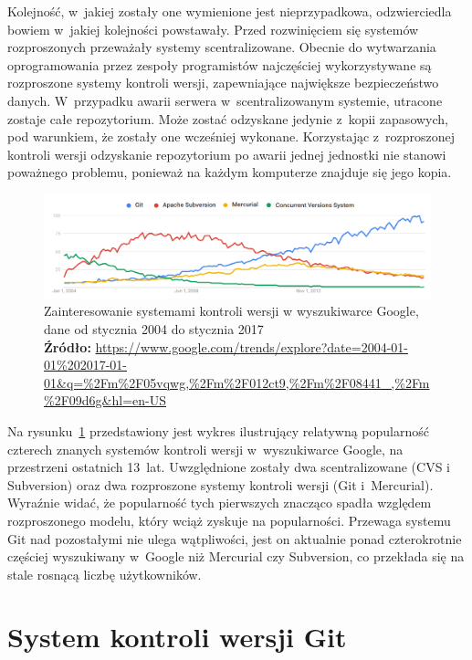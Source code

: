 \documentclass[11pt,a4paper,polish,thesis]{dcsbook}
\newcommand*{\captionsource}[2]{%
	\caption[{#1}]{%
		#1%
		\\\hspace{\linewidth}%
		\textbf{Źródło: } #2%
	}%
}
\begin{document}
	Kolejność, w~jakiej zostały one wymienione jest nieprzypadkowa, odzwierciedla bowiem w~jakiej kolejności powstawały. Przed rozwinięciem się systemów rozproszonych przeważały systemy scentralizowane. Obecnie do wytwarzania oprogramowania przez zespoły programistów najczęściej wykorzystywane są rozproszone systemy kontroli wersji, zapewniające największe bezpieczeństwo danych. W~przypadku awarii serwera w~scentralizowanym systemie, utracone zostaje całe repozytorium. Może zostać odzyskane jedynie z~kopii zapasowych, pod warunkiem, że zostały one wcześniej wykonane. Korzystając z~rozproszonej kontroli wersji odzyskanie repozytorium po awarii jednej jednostki nie stanowi poważnego problemu, ponieważ na każdym komputerze znajduje się jego kopia.
	
	\begin{figure}
		\centering
		\includegraphics[width=12cm]{vcs_interest}
		\captionsource{Zainteresowanie systemami kontroli wersji w wyszukiwarce Google, dane od stycznia 2004 do stycznia 2017}{\url{https://www.google.com/trends/explore?date=2004-01-01\%202017-01-01\&q=\%2Fm\%2F05vqwg,\%2Fm\%2F012ct9,\%2Fm\%2F08441\_,\%2Fm\%2F09d6g\&hl=en-US}}
		\label{fig:vcs_interest}
	\end{figure}

	Na rysunku~\ref{fig:vcs_interest} przedstawiony jest wykres ilustrujący relatywną popularność czterech znanych systemów kontroli wersji w~wyszukiwarce Google, na przestrzeni ostatnich 13~lat. Uwzględnione zostały dwa scentralizowane (CVS i Subversion) oraz dwa rozproszone systemy kontroli wersji (Git i~Mercurial). Wyraźnie widać, że popularność tych pierwszych znacząco spadła względem rozproszonego modelu, który wciąż zyskuje na popularności. Przewaga systemu Git nad pozostałymi nie ulega wątpliwości, jest on aktualnie ponad czterokrotnie częściej wyszukiwany w~Google niż Mercurial czy Subversion, co przekłada się na stale rosnącą liczbę użytkowników.
	
	\section{System kontroli wersji Git}
\end{document}
